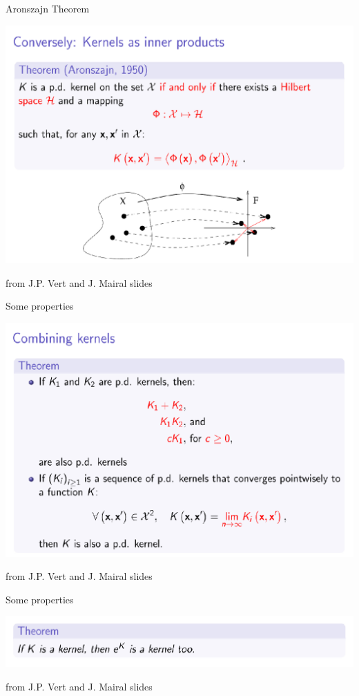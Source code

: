 \documentclass[10pt]{beamer}
\begin{document}
\begin{frame}{Aronszajn Theorem}
    \begin{center} 
        \includegraphics[width=.99\linewidth]{kernel_sgdg2020/JPV_slide20.png}
    \end{center}
    from J.P. Vert and J. Mairal slides
\end{frame}

\begin{frame}{Some properties}
    \begin{center} 
        \includegraphics[width=.99\linewidth]{kernel_sgdg2020/JPV_slide47.png}
    \end{center}
    from J.P. Vert and J. Mairal slides
\end{frame}

\begin{frame}{Some properties}
    \begin{center} 
        \includegraphics[width=.99\linewidth]{kernel_sgdg2020/JPV_slide49.png}
    \end{center}
    from J.P. Vert and J. Mairal slides
\end{frame}
\end{document}
